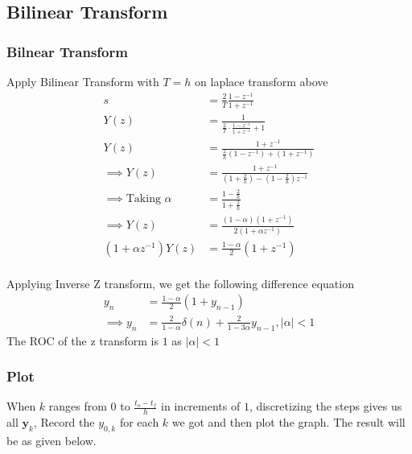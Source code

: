 \documentclass{beamer}
\providecommand{\brak}[1]{\ensuremath{\left(#1\right)}}
\theoremstyle{remark}
\providecommand{\abs}[1]{\left\vert#1\right\vert}
\let\vec\mathbf
\numberwithin{equation}{section}
\begin{document}
\subsection{Bilinear Transform}
\begin{frame}
    \frametitle{Bilnear Transform}
    Apply Bilinear Transform with $T=h$ on laplace transform above
\begin{align}
    s&=\frac{2}{T}\frac{1-z^{-1}}{1+z^{-1}}\\
    Y\brak{z}&=\frac{1}{\frac{2}{T}\cdot\frac{1-z^{-1}}{1+z^{-1}}+1}\\
    Y\brak{z}&=\frac{1+z^{-1}}{\frac{2}{h}\brak{1-z^{-1}}+\brak{1+z^{-1}}}\\
    \implies Y\brak{z}&=\frac{1+z^{-1}}{\brak{1+\frac{2}{h}}-\brak{1-\frac{2}{h}}z^{-1}}\\
    \implies \text{Taking }\alpha&=\frac{1-\frac{2}{h}}{1+\frac{2}{h}}\\
    \implies Y\brak{z}&=\frac{\brak{1-\alpha}\brak{1+z^{-1}}}{2\brak{1+\alpha z^{-1}}}\\
    \brak{1+\alpha z^{-1}}Y\brak{z}&=\frac{1-\alpha}{2}\brak{1+z^{-1}}\\
\end{align}
\end{frame}
\begin{frame}
Applying Inverse Z transform, we get the following difference equation
\begin{align}
    y_n&=\frac{1-\alpha}{2}\brak{1+y_{n-1}}\\
    \implies y_n&=\frac{2}{1-\alpha}\delta\brak{n}+\frac{2}{1-3\alpha}y_{n-1},\abs{\alpha}<1
\end{align}
The ROC of the z transform is $1$ as $\abs{\alpha}<1$
\end{frame}
\begin{frame}[fragile]
\frametitle{Plot}
When $k$ ranges from $0$ to $\frac{t_o-t_f}{h}$ in increments of $1$, discretizing the steps gives us all $\vec{y}_k$, Record the $y_{0,k}$ for each $k$ we got and then plot the graph. The result will be as given below.\\
\end{frame}
\end{document}
